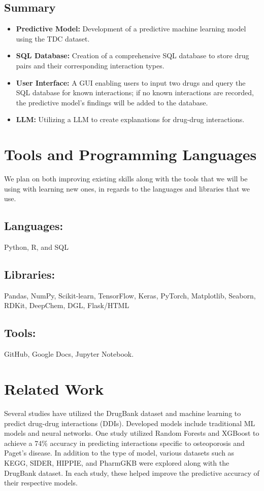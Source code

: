 \documentclass{report}
\begin{document}
\section{Summary}
\begin{itemize}
    \item \textbf{Predictive Model:} Development of a predictive machine learning model using the TDC dataset.
    \item \textbf{SQL Database:}  Creation of a comprehensive SQL database to store drug pairs and their corresponding interaction types.
    \item \textbf{User Interface:} A GUI enabling users to input two drugs and query the SQL database for known interactions; if no known interactions are recorded, the predictive model’s findings will be added to the database.
    \item \textbf{LLM:} Utilizing a LLM to create explanations for drug-drug interactions.
\end{itemize}

\chapter{Tools and Programming Languages}

We plan on both improving existing skills along with the tools that we will be using with learning new ones, in regards to the languages and libraries that we use.

\section{Languages:}
Python, R, and SQL
\section{Libraries:}
Pandas, NumPy, Scikit-learn, TensorFlow, Keras, PyTorch, Matplotlib, Seaborn, RDKit, DeepChem, DGL, Flask/HTML
\section{Tools:}
GitHub, Google Docs, Jupyter Notebook.

\chapter{Related Work}

Several studies have utilized the DrugBank dataset and machine learning to predict drug-drug interactions (DDIs). Developed models include traditional ML models and neural networks. One study utilized Random Forests and XGBoost to achieve a 74\% accuracy in predicting interactions specific to osteoporosis and Paget’s disease. In addition to the type of model, various datasets such as KEGG, SIDER, HIPPIE, and PharmGKB were explored along with the DrugBank dataset. In each study, these helped improve the predictive accuracy of their respective models.
\end{document}
